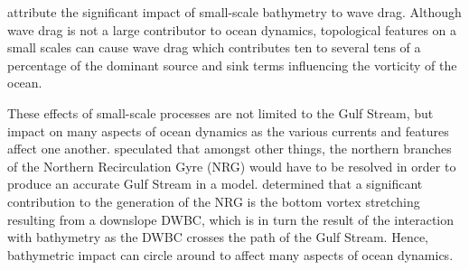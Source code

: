\documentclass[..\EOYR.tex]{subfiles}
\begin{document}
\citep{NaveiraGarabato2013} attribute the significant impact of small-scale bathymetry to wave drag. Although wave drag is not a large contributor to ocean dynamics, topological features on a small scales can cause wave drag which contributes ten to several tens of a percentage of the dominant source and sink terms influencing the vorticity of the ocean.


These effects of small-scale processes are not limited to the Gulf Stream, but impact on many aspects of ocean dynamics as the various currents and features affect one another. 
\citep{Ezer2016b} speculated that amongst other things, the northern branches of the Northern Recirculation Gyre (NRG) would have to be resolved in order to produce an accurate Gulf Stream in a model. \citep{Zhang2007} determined that a significant contribution to the generation of the NRG is the bottom vortex stretching resulting from a downslope DWBC, which is in turn the result of the interaction with bathymetry as the DWBC crosses the path of the Gulf Stream. Hence, bathymetric impact can circle around to affect many aspects of ocean dynamics.


\end{document}

